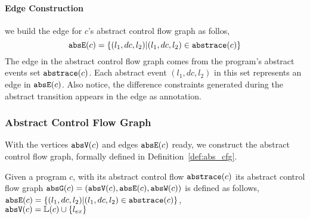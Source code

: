   \paragraph{Edge Construction}
  we build the edge for $c$'s abstract control flow graph as follos,
  \[
    \mathtt{abs}{\mathtt{E}}(c) = \{(l_1, dc, l_2) | (l_1, dc, l_2) \in \mathtt{abs}{\mathtt{trace}}(c)\}
    \]
    The edge in the abstract control flow graph comes from the program's abstract events set $\mathtt{abs}{\mathtt{trace}}(c)$.
  Each abstract event $(l_1, dc, l_2)$ in this set represents an edge in $\mathtt{abs}{\mathtt{E}}(c)$.
 Also notice, the difference constraints generated during the abstract transition appears in the edge as annotation.
%
\subsubsection{Abstract Control Flow Graph} 
With the vertices $\mathtt{abs}{\mathtt{V}}(c)$ and edges $\mathtt{abs}{\mathtt{E}}(c)$ ready, we construct the abstract control flow graph, formally 
defined in 
Definition~\ref{def:abs_cfg}.
%
\begin{defn}
\label{def:abs_cfg}
Given a program $c$, 
with its abstract control flow $\mathtt{abs}{\mathtt{trace}}(c)$
its abstract control flow graph $\mathtt{abs}{\mathtt{G}}(c) =(\mathtt{abs}{\mathtt{V}}(c), \mathtt{abs}{\mathtt{E}}(c), \mathtt{abs}{\mathtt{W}}(c))$ is defined as follows,
\\
$\mathtt{abs}{\mathtt{E}}(c) = \{(l_1, dc, l_2) | (l_1, dc, l_2) \in \mathtt{abs}{\mathtt{trace}}(c)\}$,
\\
$\mathtt{abs}{\mathtt{V}}(c) = \mathbb{L}(c)\cup\{l_{ex}\}$
\end{defn}
%
